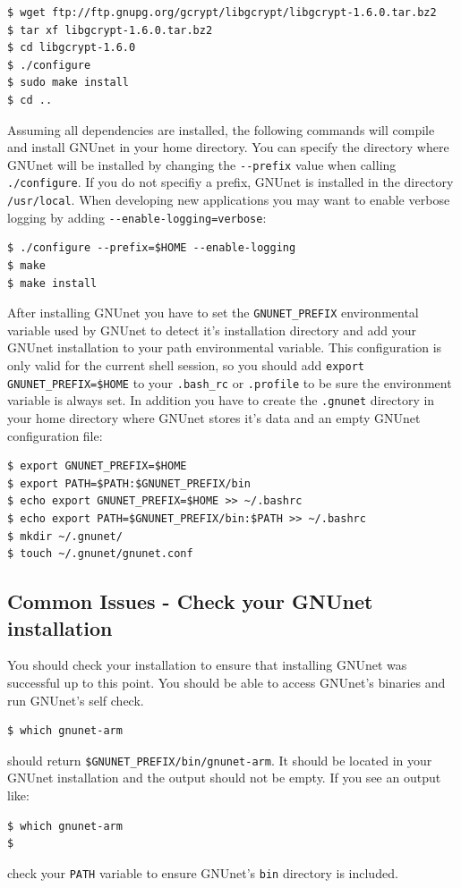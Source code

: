 \documentclass[10pt]{article}
\begin{document}
\lstset{language=bash}
\begin{lstlisting}
$ wget ftp://ftp.gnupg.org/gcrypt/libgcrypt/libgcrypt-1.6.0.tar.bz2
$ tar xf libgcrypt-1.6.0.tar.bz2
$ cd libgcrypt-1.6.0
$ ./configure
$ sudo make install
$ cd ..
\end{lstlisting}

\label{sub:install}
Assuming all dependencies are installed, the following commands will
compile and install GNUnet in your home directory. You can specify the
directory where GNUnet will be installed by changing the
\lstinline|--prefix| value when calling \lstinline|./configure|.  If
you do not specifiy a prefix, GNUnet is installed in the directory
\lstinline|/usr/local|. When developing new applications you may want
to enable verbose logging by adding
\lstinline|--enable-logging=verbose|:

\lstset{language=bash}
\begin{lstlisting}
$ ./configure --prefix=$HOME --enable-logging
$ make
$ make install
\end{lstlisting}

After installing GNUnet you have to set the \lstinline|GNUNET_PREFIX|
environmental variable used by GNUnet to detect it's installation
directory and add your GNUnet installation to your path environmental
variable.  This configuration is only valid for the current shell
session, so you should add \lstinline|export GNUNET_PREFIX=$HOME| to
your \lstinline|.bash_rc| or \lstinline|.profile| to be sure the
environment variable is always set. In addition you have to create the
\lstinline|.gnunet| directory in your home directory where GNUnet
stores it's data and an empty GNUnet configuration file:

\lstset{language=bash}
\begin{lstlisting}
$ export GNUNET_PREFIX=$HOME
$ export PATH=$PATH:$GNUNET_PREFIX/bin
$ echo export GNUNET_PREFIX=$HOME >> ~/.bashrc
$ echo export PATH=$GNUNET_PREFIX/bin:$PATH >> ~/.bashrc
$ mkdir ~/.gnunet/
$ touch ~/.gnunet/gnunet.conf
\end{lstlisting}

\subsection{Common Issues - Check your GNUnet installation}
You should check your installation to ensure that installing GNUnet
was successful up to this point. You should be able to access GNUnet's
binaries and run GNUnet's self check.
\begin{lstlisting}
$ which gnunet-arm
\end{lstlisting}
should return \lstinline|$GNUNET_PREFIX/bin/gnunet-arm|. It should be
located in your GNUnet installation and the output should not be
empty. If you see an output like:
\begin{lstlisting}
$ which gnunet-arm
$
\end{lstlisting}
check your {\tt PATH} variable to ensure GNUnet's {\tt bin} directory is included.
\end{document}

